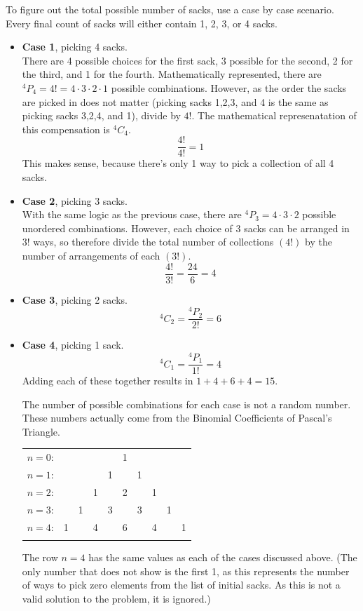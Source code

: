 \documentclass[10pt,journal,compsoc]{IEEEtran}
\newcommand*{\Perm}[2]{{}^{#1}\!P_{#2}}%
\newcommand*{\Comb}[2]{{}^{#1}C_{#2}}%
\begin{document}
To figure out the total possible number of sacks, use a case by case scenario. Every final count of sacks will either contain 1, 2, 3, or 4 sacks. 
\begin{itemize}
	\item \textbf{Case 1}, picking 4 sacks. \\
	There are 4 possible choices for the first sack, 3 possible for the second, 2 for the third, and 1 for the fourth. Mathematically represented, there are  $\Perm{4}{4} = 4! = 4\cdot3\cdot2\cdot1$ possible combinations. However, as the order the sacks are picked in does not matter (picking sacks 1,2,3, and 4 is the same as picking sacks 3,2,4, and 1), divide by $4!$. The mathematical represenatation of this compensation is $\Comb{4}{4}$. $$\frac{4!}{4!} = 1$$ This makes sense, because there's only 1 way to pick a collection of all 4 sacks. 
	\item \textbf{Case 2}, picking 3 sacks.\\
	With the same logic as the previous case, there are  $\Perm{4}{3} = 4\cdot3\cdot2$  possible unordered combinations. However, each choice of 3 sacks can be arranged in $3!$ ways, so therefore divide the total number of collections $(4!)$ by the number of arrangements of each $(3!)$. $$\frac{4!}{3!} = \frac{24}{6} = 4$$
	\item \textbf{Case 3}, picking 2 sacks.\\
	\[\Comb{4}{2} = \frac{\Perm{4}{2}}{2!} = 6\]
	\item \textbf{Case 4}, picking 1 sack.\\
	\[\Comb{4}{1} = \frac{\Perm{4}{1}}{1!} = 4\]
	Adding each of these together results in $1+4+6+4 = 15$. 
	
	The number of possible combinations for each case is not a random number. These numbers actually come from the Binomial Coefficients of Pascal's Triangle. 
	\begin{tabular}{rccccccccc}
		$n=0$:&    &    &    &    &  1
		\\\noalign{\smallskip\smallskip}
		$n=1$:&    &    &    &  1 &    &  1\\\noalign{\smallskip\smallskip}
		$n=2$:&    &    &  1 &    &  2 &    &  1\\\noalign{\smallskip\smallskip}
		$n=3$:&    &  1 &    &  3 &    &  3 &    &  1\\\noalign{\smallskip\smallskip}
		$n=4$:&  1 &    &  4 &    &  6 &    &  4 &    &  1\\\noalign{\smallskip\smallskip}
	\end{tabular}
	
	The row $n=4$ has the same values as each of the cases discussed above. (The only number that does not show is the first 1, as this represents the number of ways to pick zero elements from the list of initial sacks. As this is not a valid solution to the problem, it is ignored.)
\end{itemize}
\end{document}
